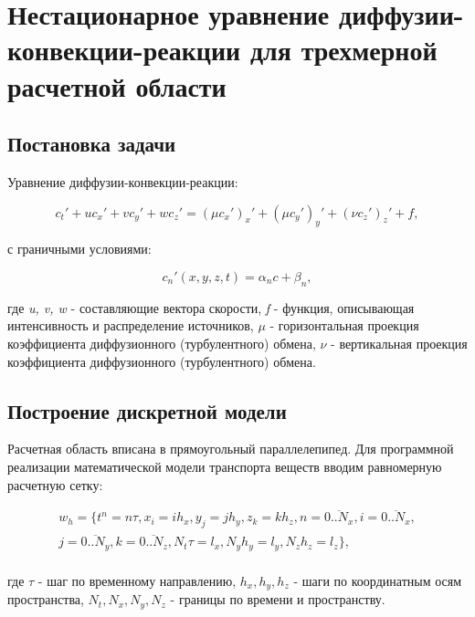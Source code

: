 \documentclass[12pt]{article}
\begin{document}
\section{Нестационарное уравнение диффузии-конвекции-реакции для трехмерной расчетной области}

\subsection{Постановка задачи}

Уравнение диффузии-конвекции-реакции:


\begin{equation}
	c_t' + uc_x' + vc_y' + wc_z' = (\mu c_x')_x' + (\mu c_y')_y' + (\nu c_z')_z' + f,	
\end{equation}

с граничными условиями:

\begin{equation}
	c_n'(x, y, z, t) = \alpha_n c + \beta_n,
\end{equation}

где
\textit{u, v, w} - составляющие вектора скорости,
\textit{f} - функция, описывающая интенсивность и распределение источников,
${\mu}$ - горизонтальная проекция коэффициента диффузионного (турбулентного) обмена,
${\nu}$ - вертикальная проекция коэффициента диффузионного (турбулентного) обмена.

\subsection{Построение дискретной модели}

Расчетная область вписана в прямоугольный параллелепипед. Для программной реализации математической модели транспорта веществ вводим равномерную расчетную сетку:

\begin{displaymath}
	\begin{split}
	w_h = \{t^n = n \tau, x_i = ih_x, y_j = jh_y, z_k = kh_z, n = \overline{0..N_x}, i = \overline{0..N_x},  \nonumber\\
	j = \overline{0..N_y}, k = \overline{0..N_z}, N_t \tau = l_x, N_yh_y = l_y, N_zh_z = l_z \}, \nonumber\\
	\end{split}
\end{displaymath}

где
${\tau}$ - шаг по временному направлению,
${h_x, h_y, h_z}$ - шаги по координатным осям пространства,
${N_t, N_x, N_y, N_z}$ - границы по времени и пространству.
\end{document}
